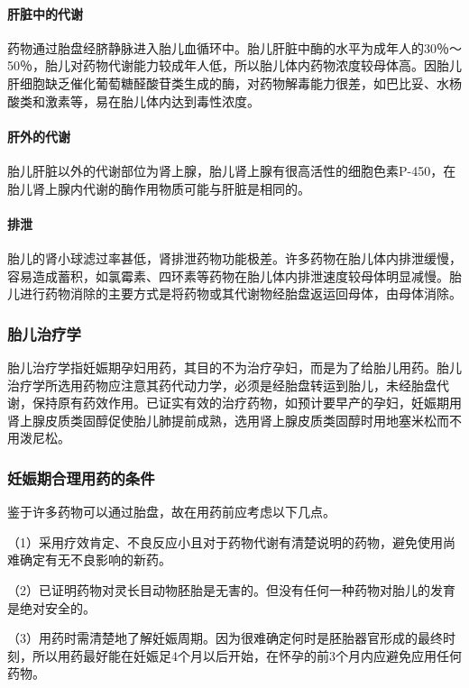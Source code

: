 \paragraph{肝脏中的代谢}

药物通过胎盘经脐静脉进入胎儿血循环中。胎儿肝脏中酶的水平为成年人的30％～50％，胎儿对药物代谢能力较成年人低，所以胎儿体内药物浓度较母体高。因胎儿肝细胞缺乏催化葡萄糖醛酸苷类生成的酶，对药物解毒能力很差，如巴比妥、水杨酸类和激素等，易在胎儿体内达到毒性浓度。
\paragraph{肝外的代谢}

胎儿肝脏以外的代谢部位为肾上腺，胎儿肾上腺有很高活性的细胞色素P-450，在胎儿肾上腺内代谢的酶作用物质可能与肝脏是相同的。
\paragraph{排泄}

胎儿的肾小球滤过率甚低，肾排泄药物功能极差。许多药物在胎儿体内排泄缓慢，容易造成蓄积，如氯霉素、四环素等药物在胎儿体内排泄速度较母体明显减慢。胎儿进行药物消除的主要方式是将药物或其代谢物经胎盘返运回母体，由母体消除。

\subsubsection{胎儿治疗学}

胎儿治疗学指妊娠期孕妇用药，其目的不为治疗孕妇，而是为了给胎儿用药。胎儿治疗学所选用药物应注意其药代动力学，必须是经胎盘转运到胎儿，未经胎盘代谢，保持原有药效作用。已证实有效的治疗药物，如预计要早产的孕妇，妊娠期用肾上腺皮质类固醇促使胎儿肺提前成熟，选用肾上腺皮质类固醇时用地塞米松而不用泼尼松。

\subsubsection{妊娠期合理用药的条件}

鉴于许多药物可以通过胎盘，故在用药前应考虑以下几点。

（1）采用疗效肯定、不良反应小且对于药物代谢有清楚说明的药物，避免使用尚难确定有无不良影响的新药。

（2）已证明药物对灵长目动物胚胎是无害的。但没有任何一种药物对胎儿的发育是绝对安全的。

（3）用药时需清楚地了解妊娠周期。因为很难确定何时是胚胎器官形成的最终时刻，所以用药最好能在妊娠足4个月以后开始，在怀孕的前3个月内应避免应用任何药物。

